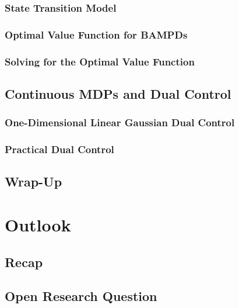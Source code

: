 		\subsection{State Transition Model} %

		\subsection{Optimal Value Function for BAMPDs} %

		\subsection{Solving for the Optimal Value Function} %

	\section{Continuous MDPs and Dual Control} %

		\subsection{One-Dimensional Linear Gaussian Dual Control} %

		\subsection{Practical Dual Control} %

	\section{Wrap-Up} %

\chapter{Outlook} %

	\section{Recap} %

	\section{Open Research Question} %
